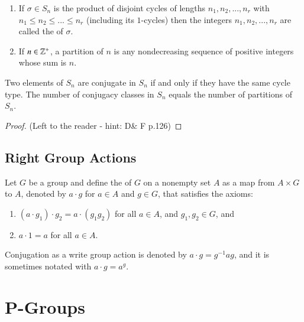 \documentclass[12pt, a4paper, oneside, openright, titlepage]{book}
\begin{document}
\begin{defn}
    \leavevmode
    \begin{enumerate}
        \item If $\sigma \in S_n$ is the product of disjoint cycles of lengths $n_1,n_2,..., n_r$ with $n_1\leq n_2\leq ...\leq n_r$ (including its $1$-cycles) then the integers $n_1,n_2,...,n_r$ are called the  of $\sigma$.
        \item If $n \in \mathbb Z^+$, a partition of $n$ is any nondecreasing sequence of positive integers whose sum is $n$.
    \end{enumerate}
\end{defn}


\begin{prop}
    Two elements of $S_n$ are conjugate in $S_n$ if and only if they have the same cycle type. The number of conjugacy classes in $S_n$ equals the number of partitions of $S_n$.
\end{prop}
\begin{proof}
    (Left to the reader - hint: D\& F p.126)
\end{proof}


\subsection{\textsection Right Group Actions}

\begin{defn}
    Let $G$ be a group and define the  of $G$ on a nonempty set $A$ as a map from $A\times G$ to $A$, denoted by $a\cdot g$ for $a \in A$ and $g\in G$, that satisfies the axioms: \begin{enumerate}
        \item $(a\cdot g_1)\cdot g_2 = a\cdot(g_1g_2)$ for all $a \in A$, and $g_1,g_2 \in G$, and 
        \item $a\cdot 1 = a$ for all $a \in A$.
    \end{enumerate}
\end{defn}

\begin{rmk}
    Conjugation as a write group action is denoted by $a \cdot g = g^{-1}ag$, and it is sometimes notated with $a\cdot g = a^g$.
\end{rmk}


\section{\textsection P-Groups}
\end{document}
